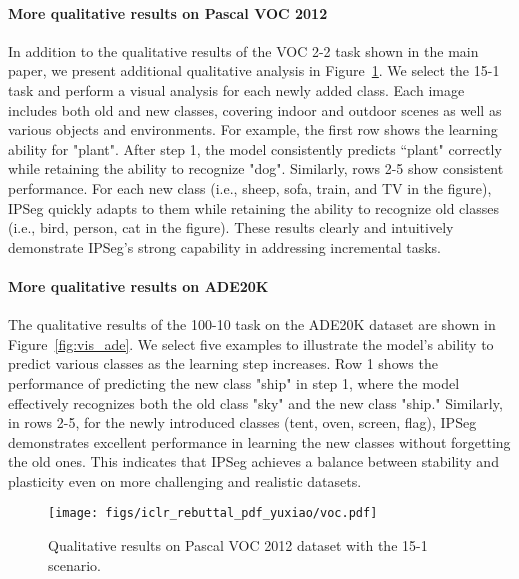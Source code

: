 \paragraph{More qualitative results on Pascal VOC 2012}
In addition to the qualitative results of the VOC 2-2 task shown in the main paper, we present additional qualitative analysis in Figure~\ref{fig:vis_voc}. We select the 15-1 task and perform a visual analysis for each newly added class. Each image includes both old and new classes, covering indoor and outdoor scenes as well as various objects and environments. For example, the first row shows the learning ability for "plant". After step 1, the model consistently predicts ``plant" correctly while retaining the ability to recognize "dog". Similarly, rows 2-5 show consistent performance. For each new class (i.e., sheep, sofa, train, and TV in the figure), IPSeg quickly adapts to them while retaining the ability to recognize old classes (i.e., bird, person, cat in the figure). These results clearly and intuitively demonstrate IPSeg's strong capability in addressing incremental tasks.





\paragraph{More qualitative results on ADE20K}
The qualitative results of the 100-10 task on the ADE20K dataset are shown in Figure~\ref{fig:vis_ade}. We select five examples to illustrate the model's ability to predict various classes as the learning step increases. Row 1 shows the performance of predicting the new class "ship" in step 1, where the model effectively recognizes both the old class "sky" and the new class "ship." Similarly, in rows 2-5, for the newly introduced classes (tent, oven, screen, flag), IPSeg demonstrates excellent performance in learning the new classes without forgetting the old ones. This indicates that IPSeg achieves a balance between stability and plasticity even on more challenging 
 and realistic datasets.

\begin{figure}[H]
    \centering
    \texttt{[image: figs/iclr\_rebuttal\_pdf\_yuxiao/voc.pdf]}
    \caption{Qualitative results on Pascal VOC 2012 dataset with the 15-1 scenario.}
    \label{fig:vis_voc}
\end{figure}

\newpage

